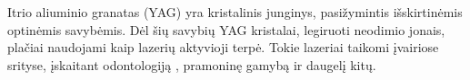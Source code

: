 \documentclass[]{VUMIFTemplateClass}
\begin{document}


Itrio aliuminio granatas (YAG) yra kristalinis junginys, pasižymintis išskirtinėmis optinėmis savybėmis. Dėl šių savybių YAG kristalai, legiruoti neodimio jonais, plačiai naudojami kaip lazerių aktyvioji terpė. Tokie lazeriai taikomi įvairiose srityse, įskaitant odontologiją \cite{valentiUseErYAG2021}, pramoninę gamybą \cite{dubeyExperimentalStudyNd2008} ir daugelį kitų.
\end{document}
